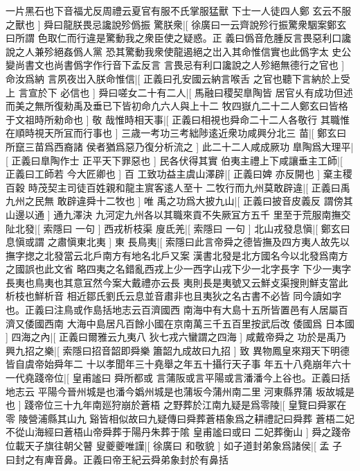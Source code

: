 一片黑石也下音福尤反周禮云夏官有服不氏掌服猛獸%
%
下士一人徒四人鄭%
玄云不服之獸也%
]%
舜曰龍朕畏忌讒說殄僞振%
驚朕衆|[%
徐廣曰一云齊說殄行振驚衆駰案鄭玄曰所謂%
色取仁而行違是驚動我之衆臣使之疑惑。正%
%
義曰僞音危腫反言畏惡利口讒說之人兼殄絕姦僞人黨%
恐其驚動我衆使龍遏絕之岀入其命惟信實也此僞字太%
%
史公變尚書文也尚書僞字作行音下孟反言%
言畏忌有利口讒說之人殄絕無德行之官也%
]%
命汝爲納%
言夙夜岀入朕命惟信|[%
正義曰孔安國云納言喉舌%
之官也聽下言納於上受上%
%
言宣於下%
必信也%
]%
舜曰嗟女二十有二人|[%
馬融曰稷契臯陶皆%
居官乆有成功但述%
%
而美之無所復勑禹及垂已下皆初命凢六人與上十二%
牧四嶽凢二十二人鄭玄曰皆格于文祖時所勑命也%
]%
敬%
哉惟時相天事|[%
正義曰相視也舜命二十二人各敬行%
其職惟在順時視天所冝而行事也%
]%
三歳一考功三考絀陟逺近衆功咸興分北三%
苗|[%
鄭玄曰所竄三苗爲西裔諸%
侯者猶爲惡乃復分析流之%
]%
此二十二人咸成厥功%
臯陶爲大理平|[%
正義曰臯陶作士%
正平天下罪惡也%
]%
民各伏得其實%
伯夷主禮上下咸讓垂主工師|[%
正義曰工師若%
今大匠卿也%
]%
百%
工致功益主虞山澤辟|[%
正義曰婢%
亦反開也%
]%
棄主稷百穀%
時茂契主司徒百姓親和龍主賔客逺人至十%
二牧行而九州莫敢辟違|[%
正義曰禹九州之民無%
敢辟違舜十二牧也%
]%
唯%
禹之功爲大披九山|[%
正義曰披音皮義反%
謂傍其山邊以通%
]%
通九澤決%
九河定九州各以其職來貢不失厥冝方五千%
里至于荒服南撫交阯北發|[%
索隱曰%
一句%
]%
西戎析枝渠%
廋氐羌|[%
索隱曰%
一句%
]%
北山戎發息愼|[%
鄭玄曰息愼或謂%
之肅愼東北夷%
]%
東%
長鳥夷|[%
索隱曰此言帝舜之德皆撫及四方夷人故先以%
撫字揔之北發當云北戶南方有地名北戶又案%
%
漢書北發是北方國名今以北發爲南方之國誤也此文省%
略四夷之名錯亂西戎上少一西字山戎下少一北字長字%
%
下少一夷字長夷也鳥夷也其意冝然今案大戴禮亦云長%
夷則長是夷號又云鮮攴渠搜則鮮支當此析枝也鮮析音%
%
相近鄒氏劉氏云息並音肅非也且夷狄之名古書不必皆%
同今讀如字也。正義曰注鳥或作島括地志云百濟國西%
%
南海中有大島十五所皆置邑有人居屬百濟又倭國西南%
大海中島居凡百餘小國在京南萬三千五百里按武后改%
%
倭國爲%
日本國%
]%
四海之內|[%
正義曰爾雅云九夷八%
狄七戎六蠻謂之四海%
]%
咸戴帝舜之%
功於是禹乃興九招之樂|[%
索隱曰招音韶即舜樂%
簫韶九成故曰九招%
]%
致%
異物鳳皇來翔天下明德皆自虞帝始舜年二%
十以孝聞年三十堯舉之年五十攝行天子事%
年五十八堯崩年六十一代堯踐帝位|[%
皇甫謐曰%
舜所都或%
%
言蒲阪或言平陽或言潘潘今上谷也。正義曰括地志云%
平陽今晉州城是也潘今嬀州城是也蒲坂今蒲州南二里%
%
河東縣界蒲%
坂故城是也%
]%
踐帝位三十九年南廵狩崩於蒼梧%
之野葬於江南九疑是爲零陵|[%
皇覽曰舜冢在零%
陵營浦縣其山九%
%
谿皆相似故曰九疑傳曰舜葬蒼梧象爲之耕禮記曰舜葬%
蒼梧二妃不從山海經曰蒼梧山帝舜葬于陽丹朱葬于隂%
%
皇甫謐曰或曰%
二妃葬衡山%
]%
舜之踐帝位載天子旗往朝父瞽%
叟夔夔唯謹|[%
徐廣曰%
和敬貌%
]%
如子道封弟象爲諸侯|[%
孟%
子%
%
曰封之有庳音鼻。正義曰帝王紀云舜弟象封於有鼻括%

